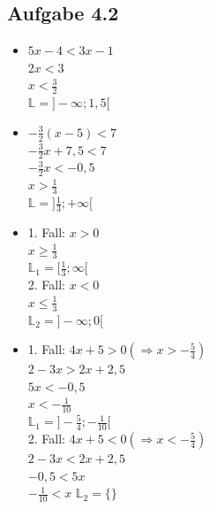 \documentclass{standalone}
\begin{document}
\subsection{Aufgabe 4.2}
\begin{itemize}
\item[a)]
$5x - 4 < 3x -1$ \\
$2x < 3$ \\
$x < \frac{3}{2}$ \\
$\mathbb{L} = ]-\infty; 1,5[$

\item[b)]
$-\frac{3}{2}(x-5) < 7$ \\
$-\frac{3}{2} x + 7,5 < 7$ \\
$-\frac{3}{2}x < -0,5 $ \\
$x > \frac{1}{3}$ \\
$\mathbb{L} = ]\frac{1}{3}; +\infty[$

\item[c)]
1. Fall: $x > 0$ \\
$x \geqslant \frac{1}{3}$\\
$\mathbb{L}_1 = [\frac{1}{3}; \infty [$ \\
2. Fall: $ x < 0$ \\
$x \leqslant \frac{1}{3}$ \\
$\mathbb{L}_2 = ]-\infty; 0[$

\item[d)]
1. Fall: $4x + 5 > 0 (\Rightarrow x > -\frac{5}{4})$ \\
$2-3x > 2x + 2,5$ \\
$5x < -0,5$ \\
$x < -\frac{1}{10}$\\
$\mathbb{L}_1 = ]-\frac{5}{4}; -\frac{1}{10}[$ \\
2. Fall: $4x + 5 < 0 (\Rightarrow x < -\frac{5}{4})$ \\
$2-3x < 2x + 2,5$ \\
$-0,5 < 5x$ \\
$-\frac{1}{10} < x$
$\mathbb{L}_2 = \{\}$

\end{itemize}
\end{document}
